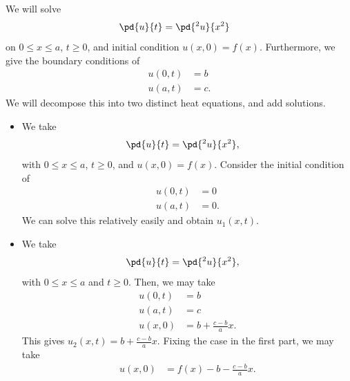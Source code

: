 \documentclass[10pt]{mypackage}
\begin{document}
\begin{example}
  We will solve
  \begin{align*}
    \pd{u}{t} &= \pd{^2u}{x^2}
  \end{align*}
  on $0 \leq x \leq a$, $t\geq 0$, and initial condition $u\left( x,0 \right) = f(x)$. Furthermore, we give the boundary conditions of
  \begin{align*}
    u\left( 0,t \right) &= b\\
    u\left( a,t \right) &= c.
  \end{align*}
  We will decompose this into two distinct heat equations, and add solutions.
  \begin{itemize}
    \item We take
      \begin{align*}
        \pd{u}{t} &= \pd{^2u}{x^2},
      \end{align*}
      with $0 \leq x \leq a$, $t\geq 0$, and $u\left( x,0 \right) = f(x)$. Consider the initial condition of
      \begin{align*}
        u\left( 0,t \right) &= 0\\
        u\left( a,t \right) &= 0.
      \end{align*}
      We can solve this relatively easily and obtain $u_1(x,t)$.
    \item We take
      \begin{align*}
        \pd{u}{t} &= \pd{^2u}{x^2},
      \end{align*}
      with $0 \leq x \leq a$ and $t\geq 0$. Then, we may take
      \begin{align*}
        u\left( 0,t \right) &= b\\
        u\left( a,t \right) &= c\\
        u\left( x,0 \right) &= b + \frac{c-b}{a}x.
      \end{align*}
      This gives $u_2\left( x,t \right) = b + \frac{c-b}{a}x$. Fixing the case in the first part, we may take
      \begin{align*}
        u\left( x,0 \right) &= f(x) - b - \frac{c-b}{a}x.
      \end{align*}
  \end{itemize}
\end{example}
\end{document}
